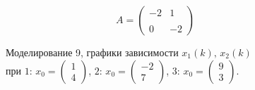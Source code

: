 \documentclass[a5paper, 10pt]{article}
\theoremstyle{definition}
\theoremstyle{plain}
\theoremstyle{remark}
\begin{document}
\begin{equation}
A =
\begin{pmatrix}
 -2 &  1\\
\\
0 &  -2
\end{pmatrix}
\end{equation}
\begin{figure}[h!]
\caption{Моделирование 9, графики зависимости $x_1 \left( k \right), \, x_2 \left( k \right)$ \\ при  $1: \, x_0 = \begin{pmatrix} 1 \\ 4 \end{pmatrix}$, $2: \, x_0 = \begin{pmatrix} -2 \\ 7 \end{pmatrix}$, $3: \, x_0 = \begin{pmatrix} 9 \\ 3 \end{pmatrix}$.}
\end{figure}


\end{document}
